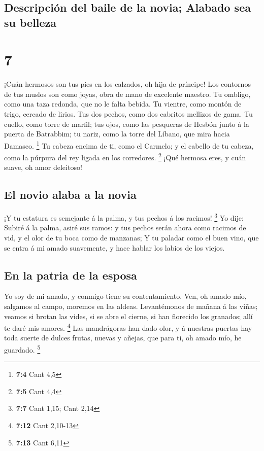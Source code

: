 \hypertarget{descripciuxf3n-del-baile-de-la-novia-alabado-sea-su-belleza}{%
\subsection{Descripción del baile de la novia; Alabado sea su
belleza}\label{descripciuxf3n-del-baile-de-la-novia-alabado-sea-su-belleza}}

\hypertarget{section-6}{%
\section{7}\label{section-6}}

 ¡Cuán hermosos son tus pies en los calzados, oh hija de
príncipe! Los contornos de tus muslos son como joyas, obra de mano de
excelente maestro.  Tu ombligo, como una taza redonda, que
no le falta bebida. Tu vientre, como montón de trigo, cercado de lirios.
 Tus dos pechos, como dos cabritos mellizos de gama.
 Tu cuello, como torre de marfil; tus ojos, como las
pesqueras de Hesbón junto á la puerta de Batrabbim; tu nariz, como la
torre del Líbano, que mira hacia Damasco. \footnote{\textbf{7:4} Cant
  4,5}  Tu cabeza encima de ti, como el Carmelo; y el
cabello de tu cabeza, como la púrpura del rey ligada en los corredores.
\footnote{\textbf{7:5} Cant 4,4}  ¡Qué hermosa eres, y cuán
suave, oh amor deleitoso!

\hypertarget{el-novio-alaba-a-la-novia}{%
\subsection{El novio alaba a la novia}\label{el-novio-alaba-a-la-novia}}

 ¡Y tu estatura es semejante á la palma, y tus pechos á los
racimos! \footnote{\textbf{7:7} Cant 1,15; Cant 2,14}  Yo
dije: Subiré á la palma, asiré sus ramos: y tus pechos serán ahora como
racimos de vid, y el olor de tu boca como de manzanas;  Y tu
paladar como el buen vino, que se entra á mi amado suavemente, y hace
hablar los labios de los viejos.

\hypertarget{en-la-patria-de-la-esposa}{%
\subsection{En la patria de la esposa}\label{en-la-patria-de-la-esposa}}

 Yo soy de mi amado, y conmigo tiene su contentamiento.
 Ven, oh amado mío, salgamos al campo, moremos en las
aldeas.  Levantémonos de mañana á las viñas; veamos si
brotan las vides, si se abre el cierne, si han florecido los granados;
allí te daré mis amores. \footnote{\textbf{7:12} Cant 2,10-13}
 Las mandrágoras han dado olor, y á nuestras puertas hay
toda suerte de dulces frutas, nuevas y añejas, que para ti, oh amado
mío, he guardado. \footnote{\textbf{7:13} Cant 6,11}

